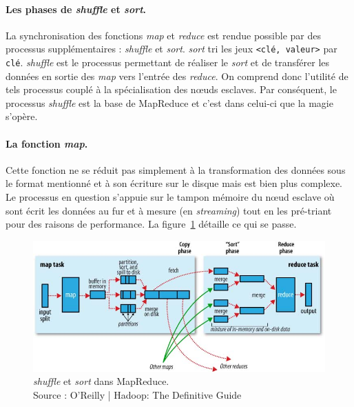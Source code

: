 \paragraph{Les phases de \textit{shuffle} et \textit{sort}.} La synchronisation des fonctions \textit{map} et \textit{reduce} est rendue possible par des processus supplémentaires : \textit{shuffle} et \textit{sort}. \textit{sort} tri les jeux \texttt{<clé, valeur>} par \texttt{clé}. \textit{shuffle} est le processus permettant de réaliser le \textit{sort} et de transférer les données en sortie des \textit{map} vers l'entrée des \textit{reduce}. On comprend donc l'utilité de tels processus couplé à la spécialisation des n\oe{}uds esclaves. Par conséquent, le processus \textit{shuffle} est la base de MapReduce et c'est dans celui-ci que la magie s'opère.

\paragraph{La fonction \textit{map}.} Cette fonction ne se réduit pas simplement à la transformation des données sous le format mentionné et à son écriture sur le disque mais est bien plus complexe. Le processus en question s'appuie sur le tampon mémoire du n\oe{}ud esclave où sont écrit les données au fur et à mesure (en \textit{streaming}) tout en les pré-triant pour des raisons de performance. La figure~\ref{fig:shuffle-sort-mapred} détaille ce qui se passe.

\begin{figure}[h!]
  \centering
  \includegraphics[scale=0.6]{images/shuffle_sort_mapred.png}
  \caption{\textit{shuffle} et \textit{sort} dans MapReduce. \\Source : O'Reilly | Hadoop: The Definitive Guide}
  \label{fig:shuffle-sort-mapred}
\end{figure}

